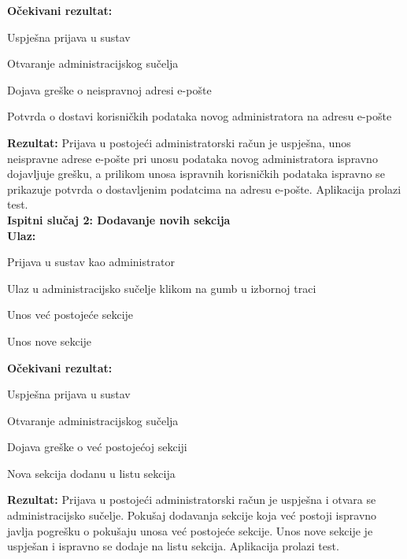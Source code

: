 			 \textbf{Očekivani rezultat:}
			 \begin{packed_enum}
			 	\item {Uspješna prijava u sustav}
			 	\item {Otvaranje administracijskog sučelja}
			 	\item {Dojava greške o neispravnoj adresi e-pošte}
			 	\item {Potvrda o dostavi korisničkih podataka novog administratora na adresu e-pošte}
			 \end{packed_enum}
			 \textbf{Rezultat: }Prijava u postojeći administratorski račun je uspješna, unos neispravne adrese e-pošte pri unosu podataka novog administratora ispravno dojavljuje grešku, a prilikom unosa ispravnih korisničkih podataka ispravno se prikazuje potvrda o dostavljenim podatcima na adresu e-pošte. {\color{green} Aplikacija prolazi test.}\\
			
			 \noindent \textbf{Ispitni slučaj 2: Dodavanje novih sekcija}\\
			 \textbf{Ulaz:}
			 \begin{packed_enum}
			 	\item {Prijava u sustav kao administrator}
			 	\item {Ulaz u administracijsko sučelje klikom na gumb u izbornoj traci}
			 	\item {Unos već postojeće sekcije}
			 	\item {Unos nove sekcije}
			 \end{packed_enum}
			 \textbf{Očekivani rezultat:}
			 \begin{packed_enum}
			 	\item {Uspješna prijava u sustav}
			 	\item {Otvaranje administracijskog sučelja}
			 	\item {Dojava greške o već postojećoj sekciji}
			 	\item {Nova sekcija dodanu u listu sekcija}
			 \end{packed_enum}
			 \textbf{Rezultat: }Prijava u postojeći administratorski račun je uspješna i otvara se administracijsko sučelje. Pokušaj dodavanja sekcije koja već postoji ispravno javlja pogrešku o pokušaju unosa već postojeće sekcije. Unos nove sekcije je uspješan i ispravno se dodaje na listu sekcija. {\color{green} Aplikacija prolazi test.}\\
			
